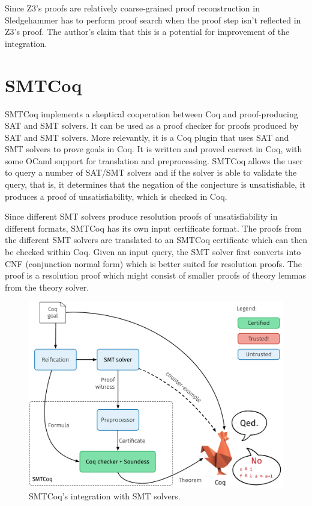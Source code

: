 \documentclass{article}
\begin{document}
		Since Z3's proofs are relatively coarse-grained
		proof reconstruction in Sledgehammer has to perform
		proof search when the proof step isn't reflected 
		in Z3's proof. The author's claim that this is 
		a potential for improvement of the integration.
		
\section{SMTCoq}
\label{sec:cert}
	SMTCoq implements a skeptical cooperation between 
	Coq and proof-producing SAT and SMT solvers. 
	It can be used as a proof checker for proofs 
	produced by SAT and SMT solvers. More relevantly, 
	it is a Coq plugin that uses SAT and SMT solvers to 
	prove goals in Coq. It is written and proved 
	correct in Coq, with some OCaml support for 
	translation and preprocessing. SMTCoq allows 
	the user to query a number of SAT/SMT solvers 
	and if the solver is able to validate the query, 
	that is, it determines that the negation of the 
	conjecture is unsatisfiable, it produces a proof 
	of unsatisfiability, which is checked in Coq.
	
	Since different SMT solvers produce resolution 
	proofs of unsatisfiability in different formats, 
	SMTCoq has its own input certificate format. 
	The proofs from the different SMT solvers are 
	translated to an SMTCoq certificate which 
	can then be checked within Coq. Given an input 
	query, the SMT solver first converts into CNF
	(conjunction normal form) which is better 
	suited for resolution proofs. The proof is a 
	resolution proof which might consist of smaller proofs 
	of theory lemmas from the theory solver. 
	
	\begin{figure}[t]
		\centering
		\includegraphics[scale=0.4]{tactic_cex.pdf}
		\caption{SMTCoq's integration with SMT solvers.}
		\label{fig:smtcoq}
	\end{figure}
	
\end{document}

